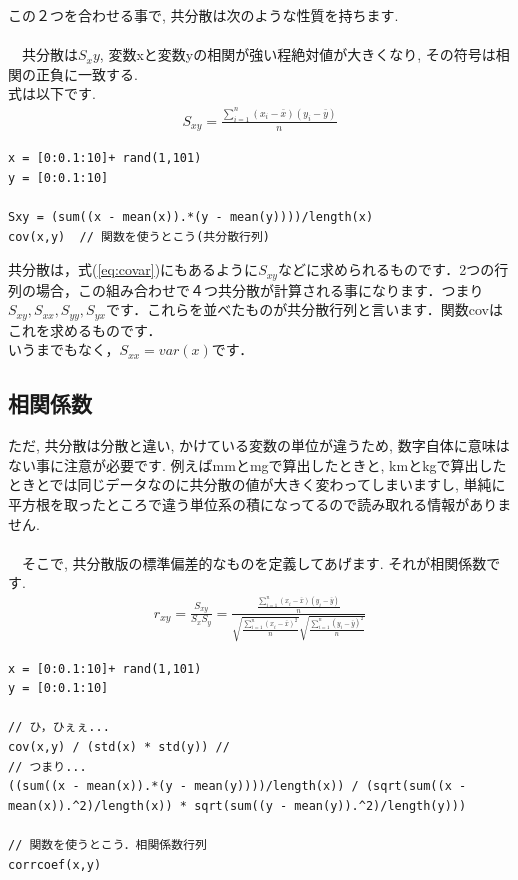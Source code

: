 \documentclass[11pt,a4paper]{jreport}
\begin{document}
この２つを合わせる事で, 共分散は次のような性質を持ちます.\\
\\
　共分散は$S_xy$, 変数xと変数yの相関が強い程絶対値が大きくなり, その符号は相関の正負に一致する.
\\
式は以下です.\\
\begin{eqnarray}
\label{eq:covar}
S_{xy} = \frac{\sum_{i=1}^{n} (x_i - \bar{x})(y_i - \bar{y})}{n}
\end{eqnarray}

\begin{lstlisting}[caption=共分散のコード,label=sc:scatter keepspaces=true，]
x = [0:0.1:10]+ rand(1,101)
y = [0:0.1:10]

Sxy = (sum((x - mean(x)).*(y - mean(y))))/length(x)
cov(x,y)  // 関数を使うとこう(共分散行列)
\end{lstlisting}
共分散は，式(\ref{eq:covar})にもあるように$S_{xy}$などに求められるものです．2つの行列の場合，この組み合わせで４つ共分散が計算される事になります．つまり$S_{xy}, S_{xx}, S_{yy}, S_{yx}$です．これらを並べたものが共分散行列と言います．関数covはこれを求めるものです．\\
いうまでもなく，$S_{xx} = var(x)$です．

\subsection{相関係数}
ただ, 共分散は分散と違い, かけている変数の単位が違うため, 数字自体に意味はない事に注意が必要です. 例えばmmとmgで算出したときと, kmとkgで算出したときとでは同じデータなのに共分散の値が大きく変わってしまいますし, 単純に平方根を取ったところで違う単位系の積になってるので読み取れる情報がありません.\\
\\
　そこで, 共分散版の標準偏差的なものを定義してあげます. それが相関係数です.\\

\begin{eqnarray}
\label{eq:correlation}
r_{xy} = \frac{S_{xy}}{S_x S_y} = \frac{\frac{\sum_{i=1}^{n} (x_i - \bar{x})(y_i - \bar{y})}{n}}{\sqrt{\frac{\sum_{i=1}^{n} (x_i - \bar{x})^2}{n}} \sqrt{\frac{\sum_{i=1}^{n} (y_i - \bar{y})^2}{n}}}
\end{eqnarray}

\begin{lstlisting}[caption=単回帰のコード,label=sc:scatter]
x = [0:0.1:10]+ rand(1,101)
y = [0:0.1:10]

// ひ，ひぇぇ...
cov(x,y) / (std(x) * std(y)) // 
// つまり...
((sum((x - mean(x)).*(y - mean(y))))/length(x)) / (sqrt(sum((x - mean(x)).^2)/length(x)) * sqrt(sum((y - mean(y)).^2)/length(y)))

// 関数を使うとこう．相関係数行列
corrcoef(x,y)
\end{lstlisting}
\end{document}
